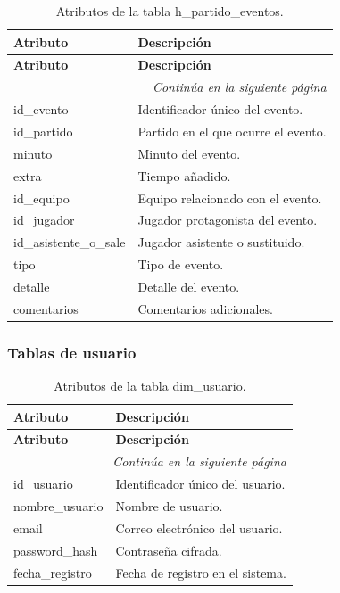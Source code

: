 \begin{longtable}{|l|l|}
\caption{Atributos de la tabla h\_partido\_eventos.} \\

\hline
\textbf{Atributo} & \textbf{Descripción} \\
\hline
\endfirsthead

\hline
\textbf{Atributo} & \textbf{Descripción} \\
\hline
\endhead

\hline
\multicolumn{2}{r}{\textit{Continúa en la siguiente página}} \\
\hline
\endfoot

\hline
\endlastfoot

id\_evento & Identificador único del evento. \\
id\_partido & Partido en el que ocurre el evento. \\
minuto & Minuto del evento. \\
extra & Tiempo añadido. \\
id\_equipo & Equipo relacionado con el evento. \\
id\_jugador & Jugador protagonista del evento. \\
id\_asistente\_o\_sale & Jugador asistente o sustituido. \\
tipo & Tipo de evento. \\
detalle & Detalle del evento. \\
comentarios & Comentarios adicionales. \\
\hline

\end{longtable}

\subsubsection{Tablas de usuario}

\begin{longtable}{|l|l|}
\caption{Atributos de la tabla dim\_usuario.} \\

\hline
\textbf{Atributo} & \textbf{Descripción} \\
\hline
\endfirsthead

\hline
\textbf{Atributo} & \textbf{Descripción} \\
\hline
\endhead

\hline
\multicolumn{2}{r}{\textit{Continúa en la siguiente página}} \\
\hline
\endfoot

\hline
\endlastfoot

id\_usuario & Identificador único del usuario. \\
nombre\_usuario & Nombre de usuario. \\
email & Correo electrónico del usuario. \\
password\_hash & Contraseña cifrada. \\
fecha\_registro & Fecha de registro en el sistema. \\
\hline

\end{longtable}

